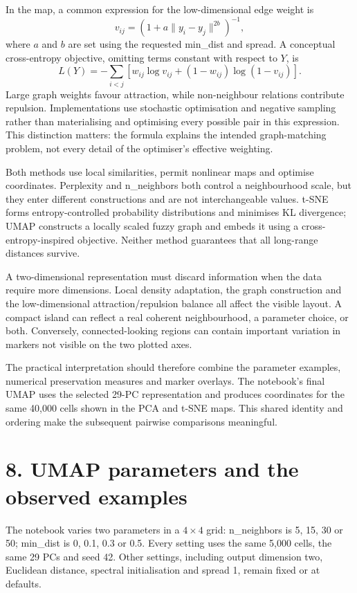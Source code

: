 \documentclass[11pt]{article}
\begin{document}
In the map, a common expression for the low-dimensional edge weight is
\[
 v_{ij}=\left(1+a\lVert y_i-y_j\rVert^{2b}\right)^{-1},
\]
where $a$ and $b$ are set using the requested min\_dist and spread. A conceptual cross-entropy objective, omitting terms constant with respect to $Y$, is
\[
 L(Y)=-\sum_{i<j}\left[w_{ij}\log v_{ij}+(1-w_{ij})\log(1-v_{ij})\right].
\]
Large graph weights favour attraction, while non-neighbour relations contribute repulsion. Implementations use stochastic optimisation and negative sampling rather than materialising and optimising every possible pair in this expression. This distinction matters: the formula explains the intended graph-matching problem, not every detail of the optimiser's effective weighting.\cite{umapdocs}

Both methods use local similarities, permit nonlinear maps and optimise coordinates. Perplexity and n\_neighbors both control a neighbourhood scale, but they enter different constructions and are not interchangeable values. t-SNE forms entropy-controlled probability distributions and minimises KL divergence; UMAP constructs a locally scaled fuzzy graph and embeds it using a cross-entropy-inspired objective. Neither method guarantees that all long-range distances survive.

A two-dimensional representation must discard information when the data require more dimensions. Local density adaptation, the graph construction and the low-dimensional attraction/repulsion balance all affect the visible layout. A compact island can reflect a real coherent neighbourhood, a parameter choice, or both. Conversely, connected-looking regions can contain important variation in markers not visible on the two plotted axes.

The practical interpretation should therefore combine the parameter examples, numerical preservation measures and marker overlays. The notebook's final UMAP uses the selected 29-PC representation and produces coordinates for the same 40,000 cells shown in the PCA and t-SNE maps. This shared identity and ordering make the subsequent pairwise comparisons meaningful.

\clearpage
\section*{8. UMAP parameters and the observed examples}
The notebook varies two parameters in a $4\times4$ grid: n\_neighbors is 5, 15, 30 or 50; min\_dist is 0, 0.1, 0.3 or 0.5. Every setting uses the same 5,000 cells, the same 29 PCs and seed 42. Other settings, including output dimension two, Euclidean distance, spectral initialisation and spread 1, remain fixed or at defaults.
\end{document}
